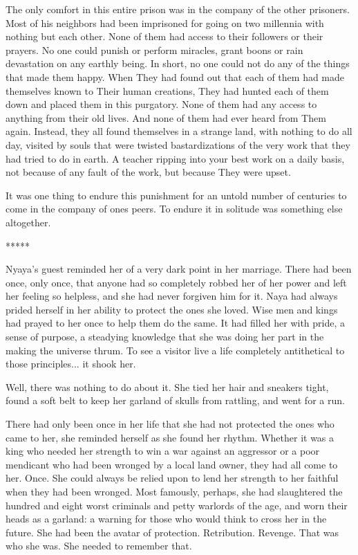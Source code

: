 \documentclass{amsart}
\begin{document}
The only comfort in this entire prison was in the company of the other prisoners. Most of his neighbors had been imprisoned for going on two millennia with nothing but each other. None of them had access to their followers or their prayers. No one could punish or perform miracles, grant boons or rain devastation on any earthly being. In short, no one could not do any of the things that made them happy. When They had found out that each of them had made themselves known to Their human creations, They had hunted each of them down and placed them in this purgatory. None of them had any access to anything from their old lives. And none of them had ever heard from Them again. Instead, they all found themselves in a strange land, with nothing to do all day, visited by souls that were twisted bastardizations of the very work that they had tried to do in earth. A teacher ripping into your best work on a daily basis, not because of any fault of the work, but because They were upset.

It was one thing to endure this punishment for an untold number of centuries to come in the company of ones peers. To endure it in solitude was something else altogether. 

\begin{center} ***** \end{center}

Nyaya's guest reminded her of a very dark point in her marriage. There had been once, only once, that anyone had so completely robbed her of her power and left her feeling so helpless, and she had never forgiven him for it. Naya had always prided herself in her ability to protect the ones she loved. Wise men and kings had prayed to her once to help them do the same. It had filled her with pride, a sense of purpose, a steadying knowledge that she was doing her part in the making the universe thrum. To see a visitor live a life completely antithetical to those principles... it shook her.

Well, there was nothing to do about it. She tied her hair and sneakers tight, found a soft belt to keep her garland of skulls from rattling, and went for a run.

There had only been once in her life that she had not protected the ones who came to her, she reminded herself as she found her rhythm. Whether it was a king who needed her strength to win a war against an aggressor or a poor mendicant who had been wronged by a local land owner, they had all come to her. Once. She could always be relied upon to lend her strength to her faithful when they had been wronged. Most famously, perhaps, she had slaughtered the hundred and eight worst criminals and petty warlords of the age, and worn their heads as a garland: a warning for those who would think to cross her in the future. She had been the avatar of protection. Retribution. Revenge. That was who she was. She needed to remember that.
\end{document}
